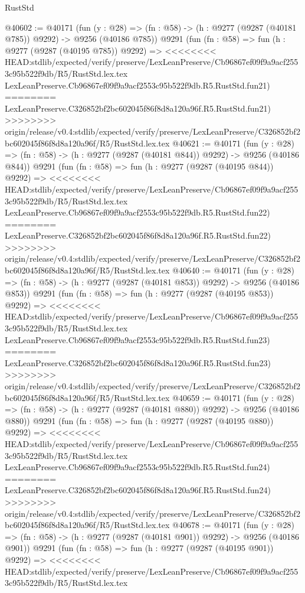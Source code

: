 \begin{lexlean}{RustStd}
\begin{coremodule}
{\begin{coremodule}
{{{{{{{{{{{{{{{{{{{{{{{{{{{{{{{{{{{{{{{{{{{{{{{{{{{{{{{@40602 := @40171
    (fun (y : @28) => (fn : @58) -> (h : @9277 (@9287 (@40181 @785)) @9292) -> @9256 (@40186 @785))
    @9291
    (fun (fn : @58) =>
    fun (h : @9277 (@9287 (@40195 @785)) @9292) =>
<<<<<<<< HEAD:stdlib/expected/verify/preserve/LexLeanPreserve/Cb96867ef09f9a9acf2553c95b522f9db/R5/RustStd.lex.tex
    LexLeanPreserve.Cb96867ef09f9a9acf2553c95b522f9db.R5.RustStd.fun21)
========
    LexLeanPreserve.C326852bf2bc602045f86f8d8a120a96f.R5.RustStd.fun21)
>>>>>>>> origin/release/v0.4:stdlib/expected/verify/preserve/LexLeanPreserve/C326852bf2bc602045f86f8d8a120a96f/R5/RustStd.lex.tex
@40621 := @40171
    (fun (y : @28) => (fn : @58) -> (h : @9277 (@9287 (@40181 @844)) @9292) -> @9256 (@40186 @844))
    @9291
    (fun (fn : @58) =>
    fun (h : @9277 (@9287 (@40195 @844)) @9292) =>
<<<<<<<< HEAD:stdlib/expected/verify/preserve/LexLeanPreserve/Cb96867ef09f9a9acf2553c95b522f9db/R5/RustStd.lex.tex
    LexLeanPreserve.Cb96867ef09f9a9acf2553c95b522f9db.R5.RustStd.fun22)
========
    LexLeanPreserve.C326852bf2bc602045f86f8d8a120a96f.R5.RustStd.fun22)
>>>>>>>> origin/release/v0.4:stdlib/expected/verify/preserve/LexLeanPreserve/C326852bf2bc602045f86f8d8a120a96f/R5/RustStd.lex.tex
@40640 := @40171
    (fun (y : @28) => (fn : @58) -> (h : @9277 (@9287 (@40181 @853)) @9292) -> @9256 (@40186 @853))
    @9291
    (fun (fn : @58) =>
    fun (h : @9277 (@9287 (@40195 @853)) @9292) =>
<<<<<<<< HEAD:stdlib/expected/verify/preserve/LexLeanPreserve/Cb96867ef09f9a9acf2553c95b522f9db/R5/RustStd.lex.tex
    LexLeanPreserve.Cb96867ef09f9a9acf2553c95b522f9db.R5.RustStd.fun23)
========
    LexLeanPreserve.C326852bf2bc602045f86f8d8a120a96f.R5.RustStd.fun23)
>>>>>>>> origin/release/v0.4:stdlib/expected/verify/preserve/LexLeanPreserve/C326852bf2bc602045f86f8d8a120a96f/R5/RustStd.lex.tex
@40659 := @40171
    (fun (y : @28) => (fn : @58) -> (h : @9277 (@9287 (@40181 @880)) @9292) -> @9256 (@40186 @880))
    @9291
    (fun (fn : @58) =>
    fun (h : @9277 (@9287 (@40195 @880)) @9292) =>
<<<<<<<< HEAD:stdlib/expected/verify/preserve/LexLeanPreserve/Cb96867ef09f9a9acf2553c95b522f9db/R5/RustStd.lex.tex
    LexLeanPreserve.Cb96867ef09f9a9acf2553c95b522f9db.R5.RustStd.fun24)
========
    LexLeanPreserve.C326852bf2bc602045f86f8d8a120a96f.R5.RustStd.fun24)
>>>>>>>> origin/release/v0.4:stdlib/expected/verify/preserve/LexLeanPreserve/C326852bf2bc602045f86f8d8a120a96f/R5/RustStd.lex.tex
@40678 := @40171
    (fun (y : @28) => (fn : @58) -> (h : @9277 (@9287 (@40181 @901)) @9292) -> @9256 (@40186 @901))
    @9291
    (fun (fn : @58) =>
    fun (h : @9277 (@9287 (@40195 @901)) @9292) =>
<<<<<<<< HEAD:stdlib/expected/verify/preserve/LexLeanPreserve/Cb96867ef09f9a9acf2553c95b522f9db/R5/RustStd.lex.tex
}}}}}}}}}}}}}}}}}}}}}}}}}}}}}}}}}}}}}}}}}}}}}}}}}}}}}}}
\end{coremodule}}
\end{coremodule}
\end{lexlean}
